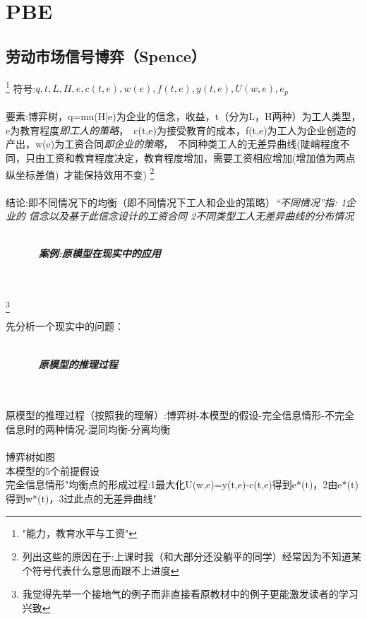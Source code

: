 \documentclass{article}
\begin{document}
\section{PBE}
\subsection{劳动市场信号博弈（Spence）}\footnote{"能力，教育水平与工资"}
符号:$q,t,L,H,e,c(t,e),w(e),f(t,e),y(t,e),U(w,e),e_p$\\\\

要素:博弈树，q=mu(H|e)为企业的信念，收益，t（分为L，H两种）为工人类型，e为教育程度\emph{即工人的策略}，\
c(t,e)为接受教育的成本，f(t,e)为工人为企业创造的产出，w(e)为工资合同\emph{即企业的策略}，\
不同种类工人的无差异曲线(陡峭程度不同，只由工资和教育程度决定，教育程度增加，需要工资相应增加(增加值为两点纵坐标差值)\
才能保持效用不变) \footnote{列出这些的原因在于:上课时我（和大部分还没躺平的同学）经常因为不知道某个符号代表什么意思而跟不上进度}\\\\

结论:即不同情况下的均衡（即不同情况下工人和企业的策略）\emph{“不同情况”指: 1企业的
信念以及基于此信念设计的工资合同 2不同类型工人无差异曲线的分布情况}\\\\
\begin{center}
    \zihao{4}
    \textbf{\emph{案例:原模型在现实中的应用}\\\\}
    \end{center}
\footnote{我觉得先举一个接地气的例子而非直接看原教材中的例子更能激发读者的学习兴致}

先分析一个现实中的问题：\\\\
\begin{center}
    \textbf{\emph{原模型的推理过程}}\\\\
    \end{center}
原模型的推理过程（按照我的理解）:博弈树-本模型的假设-完全信息情形-不完全信息时的两种情况-混同均衡-分离均衡\\\\

博弈树如图\\

本模型的5个前提假设\\完全信息情形"均衡点的形成过程:1最大化U(w,e)=y(t,e)-c(t,e)得到e*(t)，2由e*(t)得到w*(t)，3过此点的无差异曲线"\\
\end{document}
